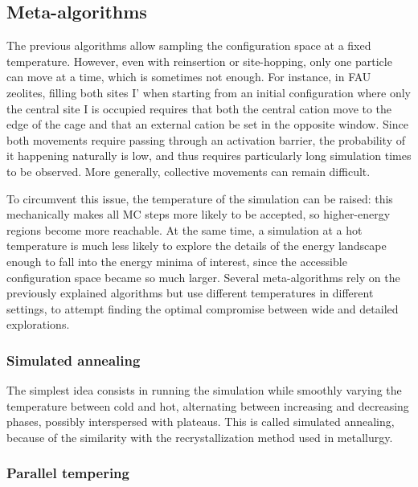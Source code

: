 \documentclass[main.tex]{subfiles}
\begin{document}
\subsection{Meta-algorithms}

The previous algorithms allow sampling the configuration space at a fixed temperature. However, even with reinsertion or site-hopping, only one particle can move at a time, which is sometimes not enough. For instance, in FAU zeolites, filling both sites I' when starting from an initial configuration where only the central site I is occupied requires that both the central cation move to the edge of the cage and that an external cation be set in the opposite window. Since both movements require passing through an activation barrier, the probability of it happening naturally is low, and thus requires particularly long simulation times to be observed. More generally, collective movements can remain difficult.

To circumvent this issue, the temperature of the simulation can be raised: this mechanically makes all MC steps more likely to be accepted, so higher-energy regions become more reachable. At the same time, a simulation at a hot temperature is much less likely to explore the details of the energy landscape enough to fall into the energy minima of interest, since the accessible configuration space became so much larger. Several meta-algorithms rely on the previously explained algorithms but use different temperatures in different settings, to attempt finding the optimal compromise between wide and detailed explorations.

\subsubsection{Simulated annealing}

The simplest idea consists in running the simulation while smoothly varying the temperature between cold and hot, alternating between increasing and decreasing phases, possibly interspersed with plateaus. This is called simulated annealing, because of the similarity with the recrystallization method used in metallurgy.



\subsubsection{Parallel tempering}

\label{paralleltempering}
\end{document}
